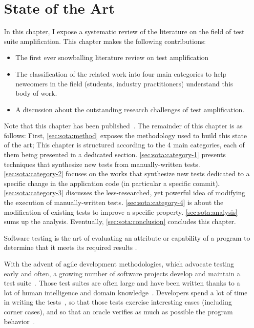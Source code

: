 \chapter{State of the Art}
\label{chap:sota}

\begin{chaptersummary}
	In this chapter, I expose a systematic review of the literature on the field of test suite amplification.
	This chapter makes the following contributions:
	\begin{itemize}
		\item The first ever snowballing literature review on test amplification
		\item The classification of the related work into four main categories to help newcomers in the field  (students, industry practitioners)  understand this body of work.
		\item A discussion about the outstanding research challenges of test amplification.
	\end{itemize}
		Note that this chapter has been published~\cite{DANGLOT2019110398}.
	The remainder of this chapter is as follows:
	First, \autoref{sec:sota:method}  exposes the methodology used to build this state of the art;
	This chapter is structured according to the 4 main categories, each of them being presented in a dedicated section.
	\autoref{sec:sota:category-1} presents techniques that synthesize new tests from manually-written tests.
	\autoref{sec:sota:category-2} focuses on the works that synthesize new tests dedicated to a specific change in the application code (in particular a specific commit).
	\autoref{sec:sota:category-3} discusses the less-researched, yet powerful idea of modifying the execution of manually-written tests. 
	\autoref{sec:sota:category-4} is about the modification of existing tests to improve a specific property.
	\autoref{sec:sota:analysis} sums up the analysis.
	Eventually, \autoref{sec:sota:conclusion} concludes this chapter.
\end{chaptersummary}

\minitoc

\graphicspath{{.}{chapitres/state-of-the-art/}}

Software testing is the art of evaluating an attribute or capability of a program to determine that it meets its required results \cite{hetzel1988}. 

With the advent of agile development methodologies, which advocate testing early and often, a growing number of software projects develop and maintain a test suite~\cite{Madeyski2010}. 
Those test suites are often large and have been written thanks to a lot of human intelligence and domain knowledge~\cite{azaidmanEMSE2011,DBLP:conf/icst/ZaidmanRDD08}. 
Developers spend a lot of time in writing the tests~\cite{BellerTSE,beller2015when,beller2015howmuch}, so that those tests exercise interesting cases (including corner cases), and so that an oracle verifies as much as possible the program behavior~\cite{hilton2018coverageevolution}.


